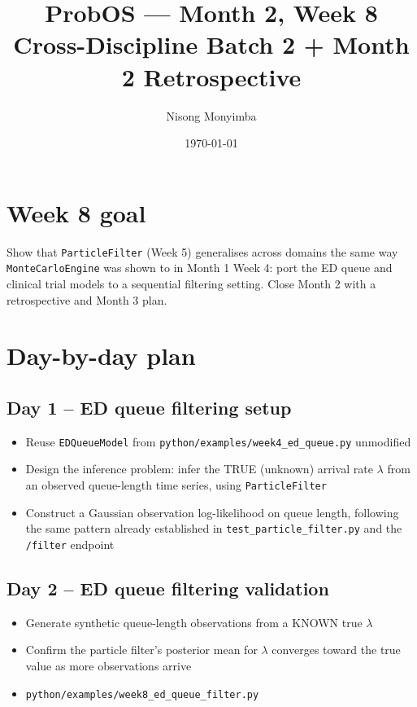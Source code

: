 \documentclass[11pt]{article}
\title{ProbOS --- Month 2, Week 8\\Cross-Discipline Batch 2 + Month 2 Retrospective}
\author{Nisong Monyimba}
\date{\today}
\begin{document}
\maketitle

\section*{Week 8 goal}
Show that \texttt{ParticleFilter} (Week 5) generalises across domains
the same way \texttt{MonteCarloEngine} was shown to in Month 1 Week 4:
port the ED queue and clinical trial models to a sequential filtering
setting. Close Month 2 with a retrospective and Month 3 plan.

\section*{Day-by-day plan}

\subsection*{Day 1 -- ED queue filtering setup}
\begin{itemize}[leftmargin=*]
  \item Reuse \texttt{EDQueueModel} from
    \texttt{python/examples/week4\_ed\_queue.py} unmodified
  \item Design the inference problem: infer the TRUE (unknown) arrival
    rate $\lambda$ from an observed queue-length time series, using
    \texttt{ParticleFilter}
  \item Construct a Gaussian observation log-likelihood on queue
    length, following the same pattern already established in
    \texttt{test\_particle\_filter.py} and the \texttt{/filter}
    endpoint
\end{itemize}

\subsection*{Day 2 -- ED queue filtering validation}
\begin{itemize}[leftmargin=*]
  \item Generate synthetic queue-length observations from a KNOWN true
    $\lambda$
  \item Confirm the particle filter's posterior mean for $\lambda$
    converges toward the true value as more observations arrive
  \item \texttt{python/examples/week8\_ed\_queue\_filter.py}
\end{itemize}
\end{document}
